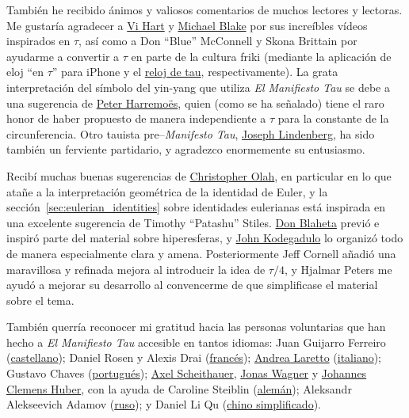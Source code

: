También he recibido ánimos y valiosos comentarios de muchos lectores y lectoras. Me gustaría agradecer a \href{http://www.youtube.com/watch?v=jG7vhMMXagQ}{Vi Hart} y \href{http://www.youtube.com/watch?v=3174T-3-59Q}{Michael Blake} por sus increíbles vídeos inspirados en $\tau$, así como a Don ``Blue'' McConnell y Skona Brittain por ayudarme a convertir a $\tau$ en parte de la cultura friki (mediante la aplicación de eloj ``en $\tau$'' para iPhone y el \href{http://www.sbcrafts.net/clocks/}{reloj de tau}, respectivamente). La grata interpretación del símbolo del yin-yang que utiliza \emph{El Manifiesto Tau} se debe a una sugerencia de \href{http://www.harremoes.dk/Peter/}{Peter Harremo\"{e}s}, quien (como se ha señalado) tiene el raro honor de haber propuesto de manera independiente a $\tau$ para la constante de la circunferencia. Otro tauista pre--\emph{Manifesto Tau}, \href{https://sites.google.com/site/taubeforeitwascool/}{Joseph Lindenberg}, ha sido también un ferviente partidario, y agradezco enormemente su entusiasmo. 

Recibí muchas buenas sugerencias de \href{http://christopherolah.wordpress.com/about-me}{Christopher Olah}, en particular en lo que atañe a la interpretación geométrica de la identidad de Euler, y la sección~\ref{sec:eulerian_identities} sobre identidades eulerianas está inspirada en una excelente sugerencia de Timothy ``Patashu'' Stiles. \href{http://www.blahedo.org/blog/archives/001083.html}{Don Blaheta} previó e inspiró parte del material sobre hiperesferas, y \href{http://spikedmath.com/forum/viewtopic.php?f=30&t=147\#p1577}{John Kodegadulo} lo organizó todo de manera especialmente clara y amena. Posteriormente Jeff Cornell añadió una maravillosa y refinada mejora al introducir la idea de $\tau/4$, y Hjalmar Peters me ayudó a mejorar su desarrollo al convencerme de que simplificase el material sobre el tema. 

También querría reconocer mi gratitud hacia las personas voluntarias que han hecho a \emph{El Manifiesto Tau} accesible en tantos idiomas: Juan Guijarro Ferreiro (\href{https://tauday.com/el-manifiesto-tau}{castellano}); Daniel Rosen y Alexis Drai (\href{https://tauday.com/le-manifeste-de-tau}{francés}); \href{https://iwilare.com/}{Andrea Laretto} (\href{https://tauday.com/il-tau-manifesto}{italiano}); Gustavo Chaves (\href{https://tauday.com/o-manifesto-tau}{portugués}); \href{https://www.linkedin.com/in/axelscheithauer/}{Axel Scheithauer}, \href{https://blog.purpureus.net/about}{Jonas Wagner} y \href{https://www.blogger.com/profile/05561964491693491031}{Johannes Clemens Huber}, con la ayuda de Caroline Steiblin (\href{https://tauday.com/das-tau-manifest}{alemán}); Aleksandr Alekseevich Adamov (\href{https://tauday.com/tau-manifesto-ru}{ruso}); y Daniel Li Qu (\href{https://tauday.com/tau-manifesto-cn}{chino simplificado}).

